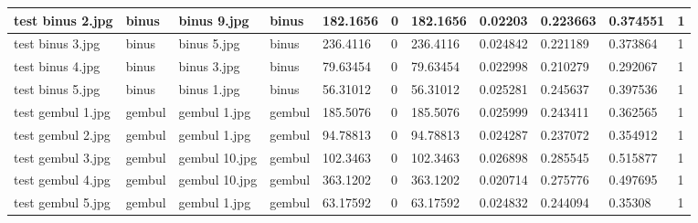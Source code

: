 \begin{landscape}
\begin{longtable}{|p{2cm}|p{1.5cm}|p{2cm}|p{1.5cm}|p{2cm}|p{1cm}|p{2cm}|p{2cm}|p{2cm}|p{2cm}|p{1cm}|}
		test binus 2.jpg     & binus            & binus 9.jpg           & binus                       & 182.1656              & 0                       & 182.1656                   & 0.02203               & 0.223663              & 0.374551                 & 1                \\ \hline
		test binus 3.jpg     & binus            & binus 5.jpg           & binus                       & 236.4116              & 0                       & 236.4116                   & 0.024842              & 0.221189              & 0.373864                 & 1                \\ \hline
		test binus 4.jpg     & binus            & binus 3.jpg           & binus                       & 79.63454              & 0                       & 79.63454                   & 0.022998              & 0.210279              & 0.292067                 & 1                \\ \hline
		test binus 5.jpg     & binus            & binus 1.jpg           & binus                       & 56.31012              & 0                       & 56.31012                   & 0.025281              & 0.245637              & 0.397536                 & 1                \\ \hline
		test gembul 1.jpg    & gembul           & gembul 1.jpg          & gembul                      & 185.5076              & 0                       & 185.5076                   & 0.025999              & 0.243411              & 0.362565                 & 1                \\ \hline
		test gembul 2.jpg    & gembul           & gembul 1.jpg          & gembul                      & 94.78813              & 0                       & 94.78813                   & 0.024287              & 0.237072              & 0.354912                 & 1                \\ \hline
		test gembul 3.jpg    & gembul           & gembul 10.jpg         & gembul                      & 102.3463              & 0                       & 102.3463                   & 0.026898              & 0.285545              & 0.515877                 & 1                \\ \hline
		test gembul 4.jpg    & gembul           & gembul 10.jpg         & gembul                      & 363.1202              & 0                       & 363.1202                   & 0.020714              & 0.275776              & 0.497695                 & 1                \\ \hline
		test gembul 5.jpg    & gembul           & gembul 1.jpg          & gembul                      & 63.17592              & 0                       & 63.17592                   & 0.024832              & 0.244094              & 0.35308                  & 1                \\ \hline

\end{longtable}
\end{landscape}
